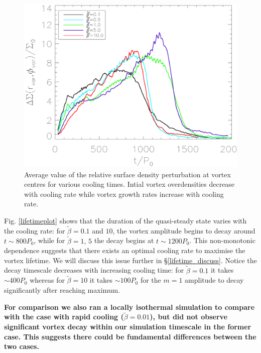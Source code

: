 \begin{figure}
  \includegraphics[width=\linewidth,clip=true,trim=0.5cm
  0cm 0cm 1cm]{figures/vortex_density}
  \caption{Average value of the relative surface density perturbation
    at vortex centres for various cooling
    times. Intial vortex overdensities decrease with cooling rate while
    vortex growth rates increase with cooling rate.
    \label{overdensity}}     
\end{figure}

Fig. \ref{lifetimeplot} shows that the duration of the quasi-steady state
varies with the cooling rate: for 
$\tilde{\beta}=0.1$ and $10$, the vortex amplitude begins to decay around
$t\sim800P_0$, while for $\tilde{\beta}=1,\,5$ the decay begins at 
$t\sim1200P_0$. This non-monotonic dependence suggests that there
exists an optimal cooling rate to maximise the vortex lifetime. We
will discuss this issue further in 
\S\ref{lifetime_discuss}. Notice the decay timescale decreases with
increasing cooling time: for $\tilde{\beta}=0.1$ it takes $\sim400P_0$
whereas for $\tilde{\beta}=10$ it takes $\sim 100P_0$ for the $m=1$
amplitude to decay significantly after reaching maximum. 


{\bf For comparison we also ran a locally isothermal simulation to
  compare with the case with rapid cooling ($\tilde{\beta}=0.01$), but
  did not observe significant vortex decay within our simulation
  timescale in the former case. This suggests there could be
  fundamental differences between the two cases.}


